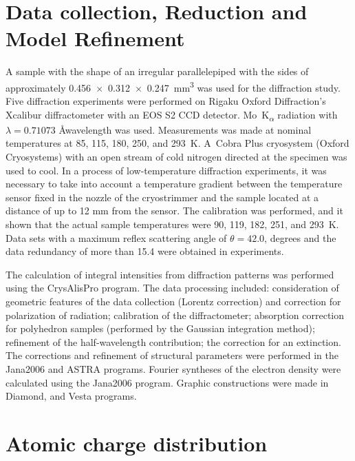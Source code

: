 \documentclass[preprint,review,12pt]{elsarticle}
\begin{document}
\section{Data collection, Reduction and Model Refinement}\label{sec:level1}
A sample with the shape of an irregular parallelepiped with the sides of approximately 0.456~$\times$~0.312~$\times$~0.247~mm\textsuperscript{3} was used for the diffraction study. Five diffraction experiments were performed on Rigaku Oxford Diffraction's Xcalibur diffractometer with an EOS S2 CCD detector. Mo~K\textsubscript{$\alpha$} radiation with  $\lambda=0.71073$ \AA  wavelength was used. Measurements was made at nominal temperatures at
85, 115, 180, 250, and 293~K.
A~Cobra Plus cryosystem (Oxford Cryosystems) with an open stream of cold nitrogen directed at the specimen was used to cool.
In a process of low-temperature diffraction experiments, it was necessary to take into account a temperature gradient between the temperature sensor fixed in the nozzle of the cryostrimmer and the sample located at a distance of up to 12 mm from the sensor.
The calibration was performed\cite{Dudka2016_2}, and it shown that the actual sample temperatures were 90, 119, 182, 251, and 293~K. Data sets with a maximum reflex scattering angle of $\theta=42.0$, degrees and the data redundancy of more than 15.4 were obtained in experiments.

The calculation of integral intensities from diffraction patterns was performed using the CrysAlisPro program\cite{Rigaku}.
The data processing included: consideration of geometric features of the data collection (Lorentz correction) and correction for polarization of radiation; calibration of the diffractometer\cite{Dudka2010}; absorption correction for polyhedron samples (performed by the Gaussian integration method\cite{Busing1957}); refinement of the half-wavelength contribution\cite{Dudka2010_2}; the correction for an extinction\cite{Becker1974}.
The corrections and refinement of structural parameters were performed in the Jana2006\cite{Petek2014} and ASTRA programs\cite{Dudka2007}.
Fourier syntheses of the electron density were calculated using the Jana2006 program\cite{Petek2014}.
Graphic constructions were made in Diamond\cite{Diamont}, and Vesta programs\cite{Momma2011}.


\section{Atomic charge distribution}\label{sec:level1}
\end{document}
